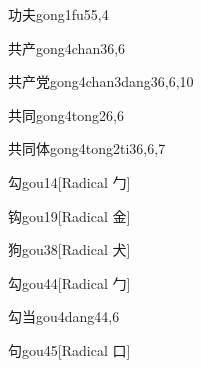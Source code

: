 \begin{verbete}{功夫}{gong1fu5}{5,4}
\end{verbete}

\begin{verbete}{共产}{gong4chan3}{6,6}
\end{verbete}

\begin{verbete}{共产党}{gong4chan3dang3}{6,6,10}
\end{verbete}

\begin{verbete}{共同}{gong4tong2}{6,6}
\end{verbete}

\begin{verbete}{共同体}{gong4tong2ti3}{6,6,7}
\end{verbete}

\begin{verbete}{勾}{gou1}{4}[Radical ⼓]
\end{verbete}

\begin{verbete}{钩}{gou1}{9}[Radical 金]
\end{verbete}

\begin{verbete}{狗}{gou3}{8}[Radical 犬]
\end{verbete}

\begin{verbete}{勾}{gou4}{4}[Radical ⼓]
\end{verbete}

\begin{verbete}{勾当}{gou4dang4}{4,6}
\end{verbete}

\begin{verbete}{句}{gou4}{5}[Radical 口]
\end{verbete}

